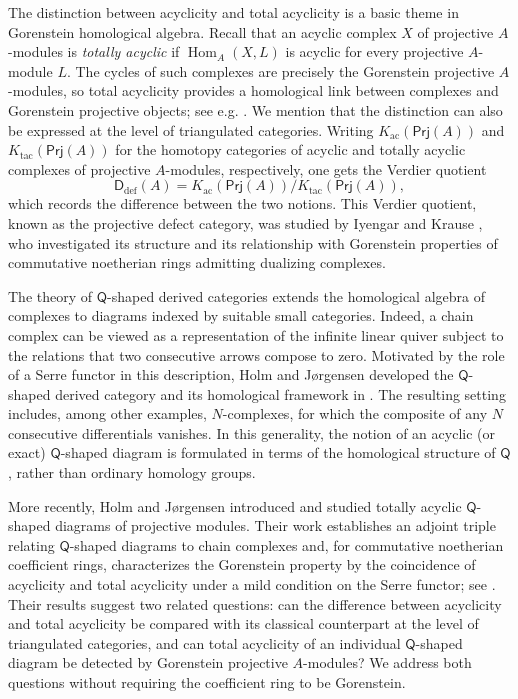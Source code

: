 \documentclass{amsart}
\theoremstyle{bfupright head,slanted body}
\theoremstyle{bfupright head,upright body}
\theoremstyle{fixed bf head,slanted body}
\theoremstyle{fixed bf head,upright body}
\theoremstyle{numbered paragraph}
\numberwithin{equation}{res}
\newcommand{\Prj}[1]{\mathsf{Prj}(#1)}
\newcommand{\Hom}{\operatorname{Hom}}
\newcommand{\Q}{\mathsf{Q}}
\begin{document}
The distinction between acyclicity and total acyclicity is a basic theme in Gorenstein homological algebra. Recall that an acyclic complex $X$ of projective $A$-modules is \emph{totally acyclic} if $\Hom_A(X,L)$ is acyclic for every projective $A$-module $L$. The cycles of such complexes are precisely the Gorenstein projective $A$-modules, so total acyclicity provides a homological link between complexes and Gorenstein projective objects; see e.g. \cite{EnochsGP,HHl04a}. We mention that the distinction can also be expressed at the level of triangulated categories. Writing $K_{\mathrm{ac}}(\Prj A)$ and $K_{\mathrm{tac}}(\Prj A)$ for the homotopy categories of acyclic and totally acyclic complexes of projective $A$-modules, respectively, one gets the Verdier quotient
$$\mathsf D_{\mathrm{def}}(A)=K_{\mathrm{ac}}(\Prj A)\big/K_{\mathrm{tac}}(\Prj A),$$
which records the difference between the two notions. This Verdier quotient, known as the projective defect category, was studied by Iyengar and Krause \cite{IyengarKrause06}, who investigated its structure and its relationship with Gorenstein properties of commutative noetherian rings admitting dualizing complexes.

The theory of $\Q$-shaped derived categories extends the homological algebra of complexes to diagrams indexed by suitable small categories. Indeed, a chain complex can be viewed as a representation of the infinite linear quiver subject to the relations that two consecutive arrows compose to zero. Motivated by the role of a Serre functor in this description, Holm and J{\o}rgensen developed the $\Q$-shaped derived category and its homological framework in
\cite{HJ22,HJ24,HJ24b}. The resulting setting includes, among other examples, $N$-complexes, for which the composite of any $N$ consecutive differentials vanishes. In this generality, the notion of an acyclic (or exact) $\Q$-shaped diagram is formulated in terms of the homological
structure of $\Q$, rather than ordinary homology groups.

More recently, Holm and J{\o}rgensen \cite{HJ26} introduced and studied totally acyclic $\Q$-shaped diagrams of projective modules. Their work establishes an adjoint triple relating $\Q$-shaped diagrams to chain complexes and, for commutative noetherian coefficient rings, characterizes the Gorenstein property by the coincidence of acyclicity and total acyclicity under a mild condition on the Serre functor; see \cite[Theorem B]{HJ26}. Their results suggest two related questions: can the difference between acyclicity and total acyclicity be compared with its classical counterpart at the level of triangulated categories, and can total acyclicity of an individual $\Q$-shaped diagram be detected by Gorenstein projective $A$-modules? We address both questions without requiring the coefficient ring to be Gorenstein.
\end{document}
